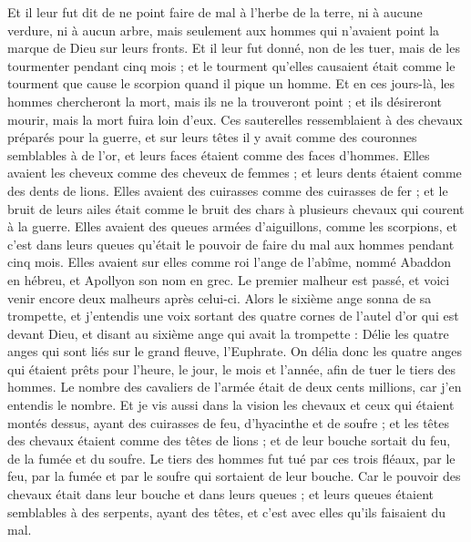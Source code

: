 \begin{multicols}{2}
Et il leur fut dit de ne point faire de mal à l'herbe de la terre, ni à aucune verdure, ni à aucun arbre, mais seulement aux hommes qui n’avaient point la marque de Dieu sur leurs fronts.
Et il leur fut donné, non de les tuer, mais de les tourmenter pendant cinq mois ; et le tourment qu’elles causaient était comme le tourment que cause le scorpion quand il pique un homme.
Et en ces jours-là, les hommes chercheront la mort, mais ils ne la trouveront point ; et ils désireront mourir, mais la mort fuira loin d'eux.
Ces sauterelles ressemblaient à des chevaux préparés pour la guerre, et sur leurs têtes il y avait comme des couronnes semblables à de l'or, et leurs faces étaient comme des faces d'hommes.
Elles avaient les cheveux comme des cheveux de femmes ; et leurs dents étaient comme des dents de lions.
Elles avaient des cuirasses comme des cuirasses de fer ; et le bruit de leurs ailes était comme le bruit des chars à plusieurs chevaux qui courent à la guerre.
Elles avaient des queues armées d’aiguillons, comme les scorpions, et c’est dans leurs queues qu’était le pouvoir de faire du mal aux hommes pendant cinq mois.
Elles avaient sur elles comme roi l'ange de l'abîme, nommé Abaddon en hébreu, et Apollyon son nom en grec{}.
Le premier malheur est passé, et voici venir encore deux malheurs après celui-ci.
Alors le sixième ange sonna de sa trompette, et j'entendis une voix sortant des quatre cornes de l'autel d'or qui est devant Dieu,
et disant au sixième ange qui avait la trompette : Délie les quatre anges qui sont liés sur le grand fleuve, l’Euphrate.
On délia donc les quatre anges qui étaient prêts pour l'heure, le jour, le mois et l'année, afin de tuer le tiers des hommes.
Le nombre des cavaliers de l’armée était de deux cents millions, car j’en entendis le nombre.
Et je vis aussi dans la vision les chevaux et ceux qui étaient montés dessus, ayant des cuirasses de feu, d'hyacinthe et de soufre ; et les têtes des chevaux étaient comme des têtes de lions ; et de leur bouche sortait du feu, de la fumée et du soufre.
Le tiers des hommes fut tué par ces trois fléaux, par le feu, par la fumée et par le soufre qui sortaient de leur bouche.
Car le pouvoir des chevaux était dans leur bouche et dans leurs queues ; et leurs queues étaient semblables à des serpents, ayant des têtes, et c’est avec elles qu’ils faisaient du mal.

\end{multicols}
